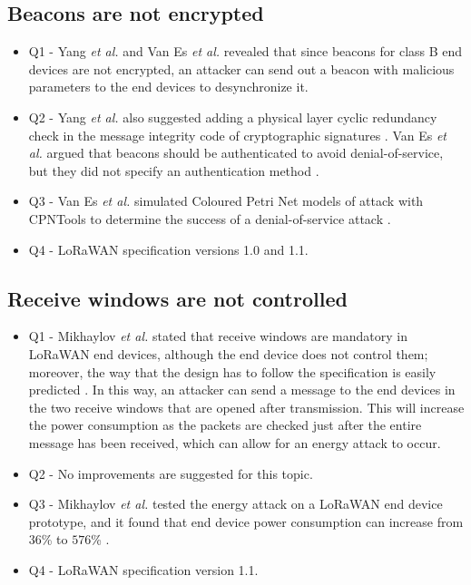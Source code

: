 \documentclass[manuscript,screen,review=false]{acmart}
\begin{document}
\subsection{Beacons are not encrypted}

\begin{itemize}
\item Q1 - Yang {\it et al.} \cite{37_security_vulnerabilities_lorawan} and Van Es {\it et al.} \cite{92_DoS_lorawan} revealed that since beacons for class B end devices are not encrypted, an attacker can send out a beacon with malicious parameters to the end devices to desynchronize it.

\item Q2 - Yang {\it et al.} also suggested adding a physical layer cyclic redundancy check in the message integrity code of cryptographic signatures \cite{37_security_vulnerabilities_lorawan}. Van Es {\it et al.} argued that beacons should be authenticated to avoid denial-of-service, but they did not specify an authentication method \cite{92_DoS_lorawan}.

\item Q3 - Van Es {\it et al.} simulated Coloured Petri Net models of attack with CPNTools to determine the success of a denial-of-service attack \cite{92_DoS_lorawan}.

\item Q4 - LoRaWAN specification versions 1.0 and 1.1.
\end{itemize}

\subsection{Receive windows are not controlled}

\begin{itemize}
\item Q1 - Mikhaylov {\it et al.} stated that receive windows are mandatory in LoRaWAN end devices, although the end device does not control them; moreover, the way that the design has to follow the specification is easily predicted \cite{99_energy_attack}. In this way, an attacker can send a message to the end devices in the two receive windows that are opened after transmission. This will increase the power consumption as the packets are checked just after the entire message has been received, which can allow for an energy attack to occur.

\item Q2 - No improvements are suggested for this topic.

\item Q3 - Mikhaylov {\it et al.} tested the energy attack on a LoRaWAN end device prototype, and it found that end device power consumption can increase from $36$\% to $576$\% \cite{99_energy_attack}.

\item Q4 - LoRaWAN specification version 1.1.
\end{itemize}
\end{document}
